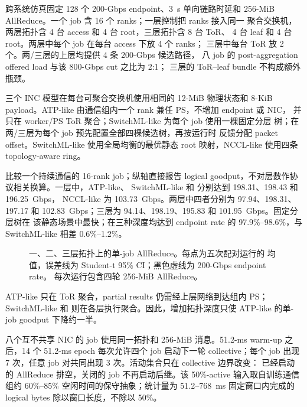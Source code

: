 跨系统仿真固定 128 个 200-Gbps endpoint、3~\textmu s 单向链路时延和
256-MiB AllReduce。一个 job 含 16 个 ranks；一层控制把 ranks 接入同一
聚合交换机，两层拓扑含 4 台 access 和 4 台 root，三层拓扑含 8 台 ToR、
4 台 leaf 和 4 台 root。两层中每个 job 在每台 access 下放 4 个 ranks；
三层中每台 ToR 放 2 个。两/三层的上层均提供 4 条 200-Gbps 候选路径，
八 job 的 post-aggregation offered load 与该 800-Gbps cut 之比为 2:1；
三层的 ToR--leaf bundle 不构成额外瓶颈。

三个 INC 模型在每台可聚合交换机使用相同的 12-MiB 物理状态和 8-KiB
payload。ATP-like 由通信组内一个 rank 兼任 PS，不增加 endpoint 或 NIC，
并只在 worker/PS ToR 聚合；SwitchML-like 为每个 job 使用一棵固定分层
树；\sysname 在两/三层为每个 job 预先配置全部四棵候选树，再按运行时
反馈分配 packet offset。SwitchML-like 使用全局均衡的最优静态 root
映射，NCCL-like 使用四条 topology-aware ring。

 比较一个持续通信的 16-rank job；纵轴直接报告
logical goodput，不对层数作协议相关换算。一层中，ATP-like、
SwitchML-like 和 \sysname 分别达到 198.31、198.43 和 196.25~Gbps，
NCCL-like 为 103.73~Gbps。两层中四者分别为 97.94、198.31、197.17 和
102.83~Gbps；三层为 94.14、198.19、195.83 和 101.95~Gbps。固定分层树在
该静态场景中最快；\sysname 在三种深度均达到 endpoint rate 的
97.9\%--98.6\%，与 SwitchML-like 相差 0.6\%--1.2\%。

\begin{figure}[t]
\centering

\caption{一、二、三层拓扑上的单-job AllReduce。每点为五次配对运行的
均值，误差线为 Student-t 95\% CI；黑色虚线为 200-Gbps endpoint rate。
每次运行包含四轮 256-MiB AllReduce。}
\label{fig:baseline-anchor}
\end{figure}

ATP-like 只在 ToR 聚合，partial results 仍需经上层网络到达组内 PS；
SwitchML-like 和 \sysname 则在各层执行聚合。因此，增加拓扑深度只使
ATP-like 的单-job goodput 下降约一半。

八个互不共享 NIC 的 job 使用同一拓扑和 256-MiB 消息。51.2-ms warm-up
之后，14 个 51.2-ms epoch 每次允许四个 job 启动下一轮 collective；每个 job
出现 7 次，任意 job 对共同出现 3 次。活动集合只在 collective 边界改变：
已经启动的 AllReduce 排空，关闭的 job 不再启动后继。该 50\%-active
输入取自训练通信组约 60\%--85\% 空闲时间的保守抽象；统计量为
51.2--768~ms 固定窗口内完成的 logical bytes 除以窗口长度，不除以
50\%。

